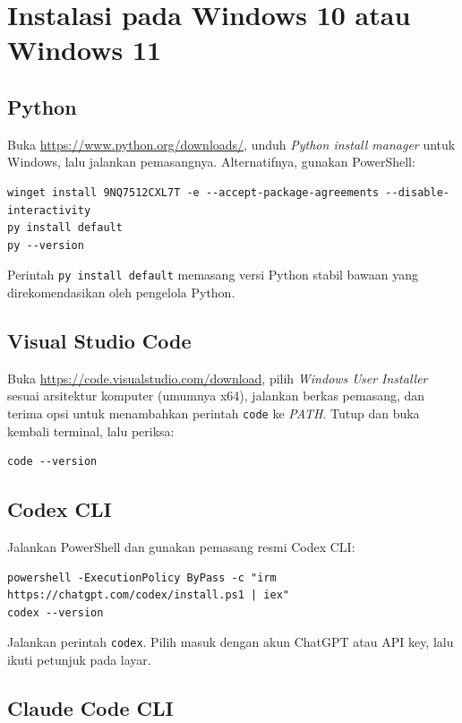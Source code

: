 \section{Instalasi pada Windows 10 atau Windows 11}

\subsection{Python}

Buka \url{https://www.python.org/downloads/}, unduh \emph{Python install
manager} untuk Windows, lalu jalankan pemasangnya. Alternatifnya, gunakan
PowerShell:

\begin{lstlisting}
winget install 9NQ7512CXL7T -e --accept-package-agreements --disable-interactivity
py install default
py --version
\end{lstlisting}

Perintah \texttt{py install default} memasang versi Python stabil bawaan yang
direkomendasikan oleh pengelola Python.

\subsection{Visual Studio Code}

Buka \url{https://code.visualstudio.com/download}, pilih \emph{Windows User
Installer} sesuai arsitektur komputer (umumnya x64), jalankan berkas pemasang,
dan terima opsi untuk menambahkan perintah \texttt{code} ke \emph{PATH}. Tutup
dan buka kembali terminal, lalu periksa:

\begin{lstlisting}
code --version
\end{lstlisting}

\subsection{Codex CLI}

Jalankan PowerShell dan gunakan pemasang resmi Codex CLI:

\begin{lstlisting}
powershell -ExecutionPolicy ByPass -c "irm https://chatgpt.com/codex/install.ps1 | iex"
codex --version
\end{lstlisting}

Jalankan perintah \texttt{codex}. Pilih masuk dengan akun ChatGPT atau API key,
lalu ikuti petunjuk pada layar.

\subsection{Claude Code CLI}

